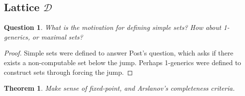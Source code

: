 \documentclass{article}
\newtheorem{theorem}{Theorem}[subsection]
\newtheorem{question}{Question}[subsection]
\begin{document}
  \subsection{Lattice $\mathcal{D}$}
    \begin{question}
      What is the motivation for defining simple sets? How about
      1-generics, or maximal sets?
    \end{question}
    \begin{proof}
      Simple sets were defined to answer Post's question, which asks if
      there exists a non-computable set below the jump. Perhaps 1-generics
      were defined to construct sets through forcing the jump.
    \end{proof}

    \begin{theorem}
      Make sense of fixed-point, and Arslanov's completeness criteria.
    \end{theorem}
\end{document}
